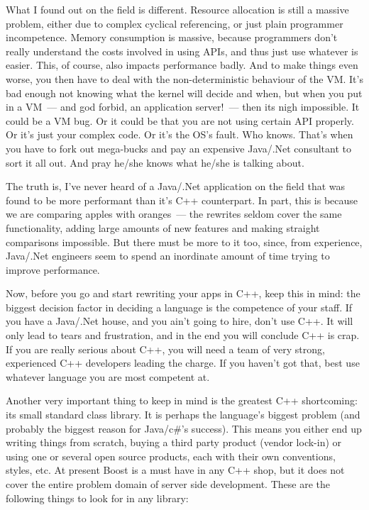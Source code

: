 \documentclass{book}
\begin{document}
What I found out on the field is different. Resource allocation is
still a massive problem, either due to complex cyclical referencing,
or just plain programmer incompetence. Memory consumption is massive,
because programmers don't really understand the costs involved in
using APIs, and thus just use whatever is easier. This, of course,
also impacts performance badly. And to make things even worse, you
then have to deal with the non-deterministic behaviour of the VM. It's
bad enough not knowing what the kernel will decide and when, but when
you put in a VM~--- and god forbid, an application server!~--- then its
nigh impossible. It could be a VM bug. Or it could be that you are not
using certain API properly. Or it's just your complex code. Or it's
the OS's fault. Who knows. That's when you have to fork out mega-bucks
and pay an expensive Java/.Net consultant to sort it all out. And pray
he/she knows what he/she is talking about.

The truth is, I've never heard of a Java/.Net application on the field
that was found to be more performant than it's C++ counterpart. In
part, this is because we are comparing apples with oranges~--- the
rewrites seldom cover the same functionality, adding large amounts of
new features and making straight comparisons impossible. But there
must be more to it too, since, from experience, Java/.Net engineers
seem to spend an inordinate amount of time trying to improve
performance.

Now, before you go and start rewriting your apps in C++, keep this in
mind: the biggest decision factor in deciding a language is the
competence of your staff. If you have a Java/.Net house, and you ain't
going to hire, don't use C++. It will only lead to tears and
frustration, and in the end you will conclude C++ is crap. If you are
really serious about C++, you will need a team of very strong,
experienced C++ developers leading the charge. If you haven't got
that, best use whatever language you are most competent at.

Another very important thing to keep in mind is the greatest C++
shortcoming: its small standard class library. It is perhaps the
language's biggest problem (and probably the biggest reason for
Java/c\#'s success). This means you either end up writing things from
scratch, buying a third party product (vendor lock-in) or using one or
several open source products, each with their own conventions, styles,
etc. At present Boost is a must have in any C++ shop, but it does not
cover the entire problem domain of server side development. These are
the following things to look for in any library:
\end{document}
